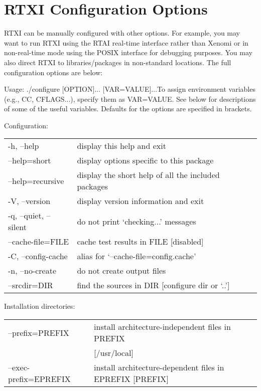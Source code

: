 \newpage
\section{RTXI Configuration Options}
RTXI can be manually configured with other options. For example, you may want to run RTXI using the RTAI real-time interface rather than Xenomi or in non-real-time mode using the POSIX interface for debugging purposes. You may also direct RTXI to libraries/packages in non-standard locations. The full configuration options are below:

\begin{maxipage}
\begin{example}
Usage: ./configure [OPTION]... [VAR=VALUE]...To assign environment variables (e.g., CC, CFLAGS...), specify them as VAR=VALUE.  See below for descriptions of some of the useful variables. Defaults for the options are specified in brackets.

Configuration:\\ \vspace{.4cm}
\begin{tabular}{ll}
-h, --help              &     display this help and exit\\
--help=short           &    display options specific to this package\\
--help=recursive    &   display the short help of all the included packages\\
-V, --version           &    display version information and exit\\
-q, --quiet, --silent   &  do not print `checking...' messages\\
--cache-file=FILE   &  cache test results in FILE [disabled]\\
-C, --config-cache    &    alias for `--cache-file=config.cache'\\
-n, --no-create       &    do not create output files\\
--srcdir=DIR     &     find the sources in DIR [configure dir or `..']\\
\end{tabular}

Installation directories:\\ \vspace{.4cm}
\begin{tabular}{ll}
--prefix=PREFIX       &    install architecture-independent files in PREFIX \\
& [/usr/local]\\
--exec-prefix=EPREFIX   &  install architecture-dependent files in EPREFIX [PREFIX]
\end{tabular}


\end{example}
\end{maxipage}
